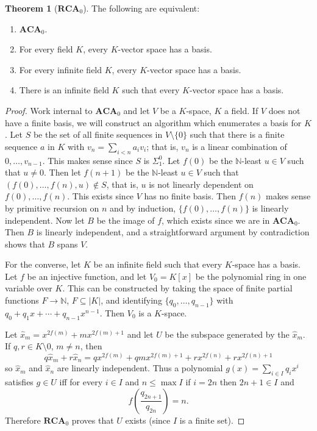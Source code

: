 \documentclass[12pt]{book}
\newcommand{\NN}{\mathbb{N}}
\newcommand{\ACA}{\mathbf{ACA}}
\newcommand{\RCA}{\mathbf{RCA}}
\theoremstyle{definition}
\newtheorem{theorem}{Theorem}[chapter]
\begin{document}
\begin{theorem}[$\RCA_0$]
The following are equivalent:
\begin{enumerate}
\item $\ACA_0$.
\item For every field $K$, every $K$-vector space has a basis.
\item For every infinite field $K$, every $K$-vector space has a basis.
\item There is an infinite field $K$ such that every $K$-vector space has a basis.
\end{enumerate}
\end{theorem}
\begin{proof}
Work internal to $\ACA_0$ and let $V$ be a $K$-space, $K$ a field.
If $V$ does not have a finite basis, we will construct an algorithm which enumerates a basis for $K$.
Let $S$ be the set of all finite sequences in $V \setminus \{0\}$ such that there is a finite sequence $a$ in $K$ with $v_n = \sum_{i < n} a_i v_i$; that is, $v_n$ is a linear combination of $0, \dots, v_{n-1}$.
This makes sense since $S$ is $\Sigma_1^0$.
Let $f(0)$ be the $\NN$-least $u \in V$ such that $u \neq 0$.
Then let $f(n+1)$ be the $\NN$-least $u \in V$ such that $(f(0), \dots, f(n), u) \notin S$, that is, $u$ is not linearly dependent on $f(0), \dots, f(n)$.
This exists since $V$ has no finite basis.
Then $f(n)$ makes sense by primitive recursion on $n$ and by induction, $\{f(0), \dots, f(n)\}$ is linearly independent.
Now let $B$ be the image of $f$, which exists since we are in $\ACA_0$.
Then $B$ is linearly independent, and a straightforward argument by contradiction shows that $B$ spans $V$.

For the converse, let $K$ be an infinite field such that every $K$-space has a basis.
Let $f$ be an injective function, and let $V_0 = K[x]$ be the polynomial ring in one variable over $K$. This can be constructed by taking the space of finite partial functions $F \to \NN$, $F \subseteq |K|$, and identifying $\{q_0, \dots, q_{n-1}\}$ with $q_0 + q_1x + \cdots + q_{n-1}x^{n-1}$.
Then $V_0$ is a $K$-space.

Let $\hat x_m = x^{2f(m)} + mx^{2f(m) + 1}$ and let $U$ be the subspace generated by the $\hat x_m$.
If $q,r \in K \setminus 0$, $m \neq n$, then
$$q\hat x_m + r\hat x_n = qx^{2f(m)} + qmx^{2f(m)+1} + rx^{2f(n)} + rx^{2f(n) + 1}$$
so $\hat x_m$ and $\hat x_n$ are linearly independent.
Thus a polynomial $g(x) = \sum_{i \in I} q_ix^i$ satisfies $g \in U$ iff for every $i \in I$ and $n \leq \max I$ if $i = 2n$ then $2n + 1 \in I$ and
$$f\left(\frac{q_{2n+1}}{q_{2n}}\right) = n.$$
Therefore $\RCA_0$ proves that $U$ exists (since $I$ is a finite set).


\end{proof}
\end{document}
